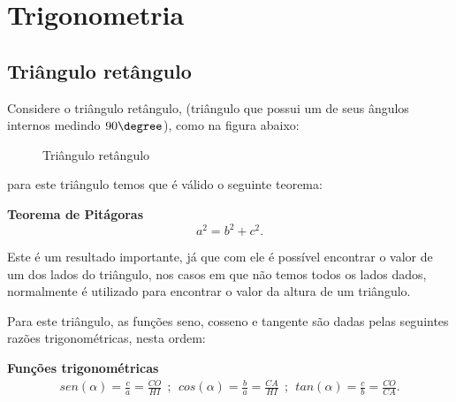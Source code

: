 \chapter{Trigonometria}

\section{Triângulo retângulo}
%
  Considere o triângulo retângulo, (triângulo que possui um de seus ângulos internos medindo $90 \degree$), como na figura abaixo:
  \begin{figure}[H]
   \centering
   \caption{Triângulo retângulo}
  \end{figure}
 para este triângulo temos que é válido o seguinte teorema:

 \vskip0.3cm

\colorbox{azul}{
 \begin{minipage}{0.9\linewidth}
 \begin{center}
 \textbf{Teorema de Pitágoras}
  \[a^2= b^2 + c^2.\]
 \end{center}
 \end{minipage}}

 \vskip0.3cm

 Este é um resultado importante, já que com ele é possível encontrar o valor de um dos lados do triângulo, nos casos em que não temos todos os lados dados, normalmente é utilizado para encontrar o valor da altura de um triângulo.

 Para este triângulo, as funções seno, cosseno e tangente são dadas pelas seguintes razões trigonométricas, nesta ordem:

 \vskip0.3cm

\colorbox{azul}{
 \begin{minipage}{0.9\linewidth}
 \begin{center}
 \textbf{Funções trigonométricas}
  \begin{eqnarray*}
   sen(\alpha)= \frac{c}{a}= \frac{CO}{HI} \ \ ; \ \ cos(\alpha)= \frac{b}{a}= \frac{CA}{HI} \ \ ; \ \ tan(\alpha)= \frac{c}{b}= \frac{CO}{CA}.
 \end{eqnarray*}
 \end{center}
 \end{minipage}}

